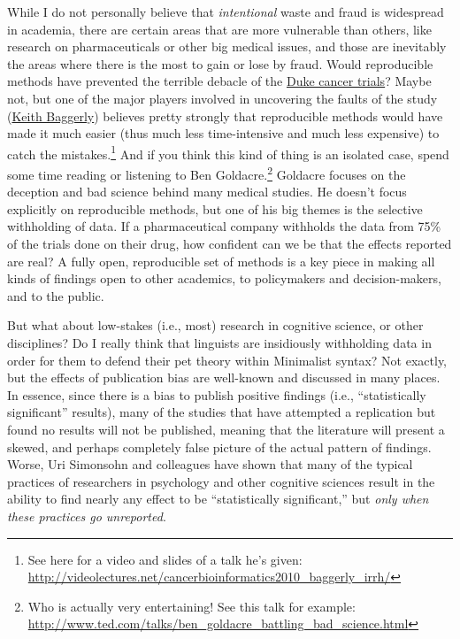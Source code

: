 \documentclass{book}
\begin{document}
While I do not personally believe that \emph{intentional} waste and fraud is widespread in academia, there are certain areas that are more vulnerable than others, like research on pharmaceuticals or other big medical issues, and those are inevitably the areas where there is the most to gain or lose by fraud. Would reproducible methods have prevented the terrible debacle of the \href{http://news.sciencemag.org/scienceinsider/2011/09/flawed-cancer-trial-at-duke-sparks.html}{Duke cancer trials}? Maybe not, but one of the major players involved in uncovering the faults of the study (\href{http://odin.mdacc.tmc.edu/~kabaggerly/}{Keith Baggerly}) believes pretty strongly that reproducible methods would have made it much easier (thus much less time-intensive and much less expensive) to catch the mistakes.\footnote{See here for a video and slides of a talk he's given:\\ \href{http://videolectures.net/cancerbioinformatics2010_baggerly_irrh/}{http://videolectures.net/cancerbioinformatics2010\_baggerly\_irrh/}
 }  And if you think this kind of thing is an isolated case, spend some time reading or listening to Ben Goldacre.\footnote{Who is actually very entertaining!  See this talk for example:\\ \href{http://www.ted.com/talks/ben_goldacre_battling_bad_science.html}{http://www.ted.com/talks/ben\_goldacre\_battling\_bad\_science.html}
 } Goldacre focuses on the deception and bad science behind many medical studies. He doesn't focus explicitly on reproducible methods, but one of his big themes is the selective withholding of data. If a pharmaceutical company withholds the data from 75\% of the trials done on their drug, how confident can we be that the effects reported are real?  A fully open, reproducible set of methods is a key piece in making all kinds of findings open to other academics, to policymakers and decision-makers, and to the public.

But what about low-stakes (i.e., most) research in cognitive science, or other disciplines?  Do I really think that linguists are insidiously withholding data in order for them to defend their pet theory within Minimalist syntax?  Not exactly, but the effects of publication bias are well-known and discussed in many places. In essence, since there is a bias to publish positive findings (i.e., ``statistically significant'' results), many of the studies that have attempted a replication but found no results will not be published, meaning that the literature will present a skewed, and perhaps completely false picture of the actual pattern of findings.  Worse, Uri Simonsohn and colleagues \parencite[e.g.,][]{simmons2011false} have shown that many of the typical practices of researchers in psychology and other cognitive sciences result in the ability to find nearly any effect to be ``statistically significant,'' but \emph{only when these practices go unreported}.
\end{document}
